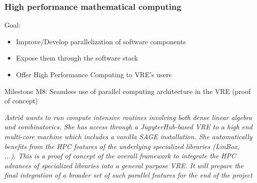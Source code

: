 \documentclass{beamer}
\begin{document}
\begin{frame}
  \frametitle{High performance mathematical computing}
  \begin{block}
    {Goal:}
    \begin{itemize}
    \item Improve/Develop parallelization of software components
    \item Expose them through the software stack
    \item Offer High Performance Computing to VRE's users
    \end{itemize}
  \end{block}

  \begin{block}
      {Milestone M8: Seamless use of parallel computing architecture in the VRE (proof of concept)}

{\footnotesize  \textit{Astrid wants to run compute intensive routines involving both dense linear algebra and combinatorics. She has access through a JupyterHub-based VRE to a high end multi-core machine which includes a vanilla SAGE installation.
She automatically benefits from the HPC features of the underlying specialized
libraries (LinBox, ...). This is a proof of concept of the overall framework to
integrate the HPC advances of specialized libraries into a general purpose
VRE. It will prepare the final integration of a broader set of such parallel
features for the end of the project}
  }

  \end{block}
\end{frame}



\end{document}
